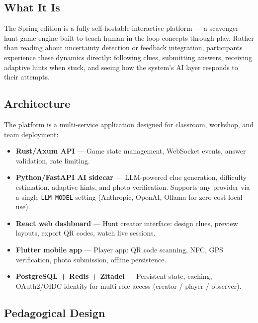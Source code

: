 \documentclass[12pt, a4paper]{article}
\begin{document}
\begin{tcolorbox}[editionbox=springgreen, title=Spring Edition \textbullet\ Interactive Scavenger-Hunt Platform]

\subsection*{\color{charcoal} What It Is}

The Spring edition is a fully self-hostable interactive platform — a scavenger-hunt game engine built to teach human-in-the-loop concepts through play. Rather than reading about uncertainty detection or feedback integration, participants experience these dynamics directly: following clues, submitting answers, receiving adaptive hints when stuck, and seeing how the system's AI layer responds to their attempts.

\subsection*{\color{charcoal} Architecture}

The platform is a multi-service application designed for classroom, workshop, and team deployment:

\begin{itemize}
  \item \textbf{Rust/Axum API} — Game state management, WebSocket events, answer validation, rate limiting.
  \item \textbf{Python/FastAPI AI sidecar} — LLM-powered clue generation, difficulty estimation, adaptive hints, and photo verification. Supports any provider via a single \texttt{LLM\_MODEL} setting (Anthropic, OpenAI, Ollama for zero-cost local use).
  \item \textbf{React web dashboard} — Hunt creator interface: design clues, preview layouts, export QR codes, watch live sessions.
  \item \textbf{Flutter mobile app} — Player app: QR code scanning, NFC, GPS verification, photo submission, offline persistence.
  \item \textbf{PostgreSQL + Redis + Zitadel} — Persistent state, caching, OAuth2/OIDC identity for multi-role access (creator / player / observer).
\end{itemize}

\subsection*{\color{charcoal} Pedagogical Design}


\end{tcolorbox}
\end{document}
